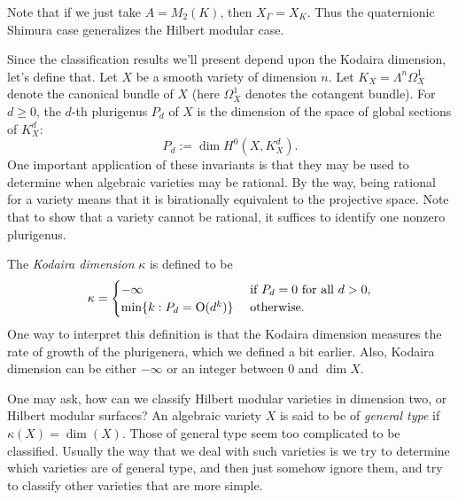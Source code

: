 \documentclass[reqno]{amsart} 
\numberwithin{theorem}{section}
\numberwithin{equation}{section}
\begin{document}
Note that if we just take $A = M_2(K)$, then $X_\Gamma = X_K$.  Thus the quaternionic Shimura case generalizes the Hilbert modular case.

Since the classification results we'll present depend upon the Kodaira dimension, let's define that.  Let $X$ be a smooth variety of dimension $n$.  Let $K_X = \Lambda^n \Omega_X^1$ denote the canonical bundle of $X$ (here $\Omega_X^1$ denotes the cotangent bundle).  For $d \geq 0$, the $d$-th plurigenus $P_d$ of $X$ is the dimension of the space of global sections of $K_X^d$:
\begin{equation*}
  P_d := \dim H^0(X, K_X^d).
\end{equation*}
One important application of these invariants is that they may be used to determine when algebraic varieties may be rational.  By the way, being rational for a variety means that it is birationally equivalent to the projective space.  Note that to show that a variety cannot be rational, it suffices to identify one nonzero plurigenus.

The \emph{Kodaira dimension} $\kappa$ is defined to be
\begin{equation*}
  \kappa =
  \begin{cases}
    - \infty    & \text{ if } P_d = 0 \text{ for all } d > 0, \\
    \min \{k : P_d = \operatorname{O}(d^k)\}           & \text{ otherwise}.
  \end{cases}
\end{equation*}
One way to interpret this definition is that the Kodaira dimension measures the rate of growth of the plurigenera, which we defined a bit earlier.  Also, Kodaira dimension can be either $- \infty$ or an integer between $0$ and $\dim X$.

One may ask, how can we classify Hilbert modular varieties in dimension two, or Hilbert modular surfaces?  An algebraic variety $X$ is said to be of \emph{general type} if $\kappa(X) = \dim(X)$.  Those of general type seem too complicated to be classified.  Usually the way that we deal with such varieties is we try to determine which varieties are of general type, and then just somehow ignore them, and try to classify other varieties that are more simple.
\end{document}
